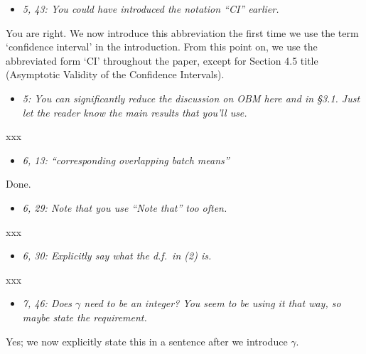 \documentclass[11pt,notitlepage,onecolumn]{article}
\newcommand{\noi}{\noindent}
\begin{document}
\begin{itemize}
\item[] \textit{5, 43: You could have introduced the notation ``CI'' earlier.}
\end{itemize}

\noi
You are right. 
We now introduce this abbreviation the first time we use the term `confidence interval' in the introduction. 
From this point on, we use the abbreviated form `CI' throughout the paper, except for Section 4.5 title (Asymptotic Validity of the Confidence Intervals). 
\medskip 



\begin{itemize}
\item[] \textit{5: You can significantly reduce the discussion on OBM here and in \S 3.1. 
Just let the reader know the main results that you'll use.}
\end{itemize}

\noi
xxx  
\medskip 



\begin{itemize}
\item[] \textit{6, 13: ``corresponding overlapping batch means''}
\end{itemize}

\noi
Done. 
\medskip 



\begin{itemize}
\item[] \textit{6, 29: Note that you use ``Note that'' too often.}
\end{itemize}

\noi
xxx  
\medskip 



\begin{itemize}
\item[] \textit{6, 30: Explicitly say what the d.f.\ in (2) is.}
\end{itemize}

\noi
xxx  
\medskip 



\begin{itemize}
\item[] \textit{7, 46: Does $\gamma$ need to be an integer? 
You seem to be using it that way, so maybe state the requirement.}
\end{itemize}

\noi
Yes; we now explicitly state this in a sentence after we introduce $\gamma$. 
\medskip 
\end{document}
